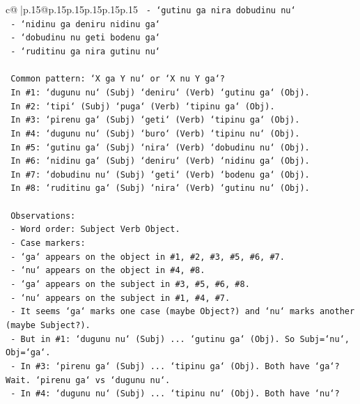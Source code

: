 \documentclass{article}
\begin{document}
{\begin{supertabular}{c@{$\;$}|p{.15\linewidth}@{}p{.15\linewidth}p{.15\linewidth}p{.15\linewidth}p{.15\linewidth}p{.15\linewidth}}
{{{\texttt{   {-} `gutinu ga nira dobudinu nu`} \\
\texttt{   {-} `nidinu ga deniru nidinu ga`} \\
\texttt{   {-} `dobudinu nu geti bodenu ga`} \\
\texttt{   {-} `ruditinu ga nira gutinu nu`} \\
\\ 
\texttt{   Common pattern: `X ga Y nu` or `X nu Y ga`?} \\
\texttt{   In \#1: `dugunu nu` (Subj) `deniru` (Verb) `gutinu ga` (Obj).} \\
\texttt{   In \#2: `tipi` (Subj) `puga` (Verb) `tipinu ga` (Obj).} \\
\texttt{   In \#3: `pirenu ga` (Subj) `geti` (Verb) `tipinu ga` (Obj).} \\
\texttt{   In \#4: `dugunu nu` (Subj) `buro` (Verb) `tipinu nu` (Obj).} \\
\texttt{   In \#5: `gutinu ga` (Subj) `nira` (Verb) `dobudinu nu` (Obj).} \\
\texttt{   In \#6: `nidinu ga` (Subj) `deniru` (Verb) `nidinu ga` (Obj).} \\
\texttt{   In \#7: `dobudinu nu` (Subj) `geti` (Verb) `bodenu ga` (Obj).} \\
\texttt{   In \#8: `ruditinu ga` (Subj) `nira` (Verb) `gutinu nu` (Obj).} \\
\\ 
\texttt{   Observations:} \\
\texttt{   {-} Word order: Subject Verb Object.} \\
\texttt{   {-} Case markers:} \\
\texttt{     {-} `ga` appears on the object in \#1, \#2, \#3, \#5, \#6, \#7.} \\
\texttt{     {-} `nu` appears on the object in \#4, \#8.} \\
\texttt{     {-} `ga` appears on the subject in \#3, \#5, \#6, \#8.} \\
\texttt{     {-} `nu` appears on the subject in \#1, \#4, \#7.} \\
\texttt{   {-} It seems `ga` marks one case (maybe Object?) and `nu` marks another (maybe Subject?).} \\
\texttt{   {-} But in \#1: `dugunu nu` (Subj) ... `gutinu ga` (Obj). So Subj=`nu`, Obj=`ga`.} \\
\texttt{   {-} In \#3: `pirenu ga` (Subj) ... `tipinu ga` (Obj). Both have `ga`? Wait. `pirenu ga` vs `dugunu nu`.} \\
\texttt{   {-} In \#4: `dugunu nu` (Subj) ... `tipinu nu` (Obj). Both have `nu`?} \\
}}}
\end{supertabular}}
\end{document}
